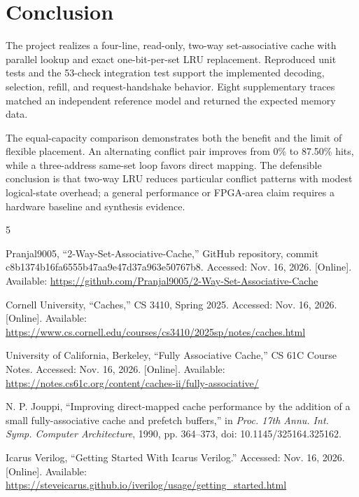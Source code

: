 \documentclass[conference]{IEEEtran}
\begin{document}
\section{Conclusion}

The project realizes a four-line, read-only, two-way set-associative
cache with parallel lookup and exact one-bit-per-set LRU replacement.
Reproduced unit tests and the 53-check integration test support the
implemented decoding, selection, refill, and request-handshake behavior.
Eight supplementary traces matched an independent reference model and
returned the expected memory data.

The equal-capacity comparison demonstrates both the benefit and the
limit of flexible placement. An alternating conflict pair improves from
0\% to 87.50\% hits, while a three-address same-set loop favors direct
mapping. The defensible conclusion is that two-way LRU reduces
particular conflict patterns with modest logical-state overhead; a
general performance or FPGA-area claim requires a hardware baseline and
synthesis evidence.

\begin{thebibliography}{5}

Pranjal9005, ``2-Way-Set-Associative-Cache,'' GitHub repository, commit
c8b1374b16fa6555b47aa9e47d37a963e50767b8. Accessed: Nov. 16, 2026.
[Online]. Available:
\url{https://github.com/Pranjal9005/2-Way-Set-Associative-Cache}

Cornell University, ``Caches,'' CS 3410, Spring 2025. Accessed: Nov. 16,
2026. [Online]. Available:
\url{https://www.cs.cornell.edu/courses/cs3410/2025sp/notes/caches.html}

University of California, Berkeley, ``Fully Associative Cache,'' CS 61C
Course Notes. Accessed: Nov. 16, 2026. [Online]. Available:
\url{https://notes.cs61c.org/content/caches-ii/fully-associative/}

N. P. Jouppi, ``Improving direct-mapped cache performance by the
addition of a small fully-associative cache and prefetch buffers,'' in
\emph{Proc. 17th Annu. Int. Symp. Computer Architecture}, 1990,
pp. 364--373, doi: 10.1145/325164.325162.

Icarus Verilog, ``Getting Started With Icarus Verilog.'' Accessed:
Nov. 16, 2026. [Online]. Available:
\url{https://steveicarus.github.io/iverilog/usage/getting_started.html}

\end{thebibliography}
\end{document}

